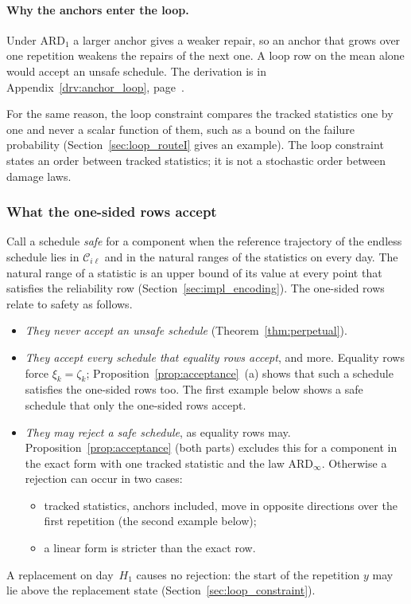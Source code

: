 \documentclass[11pt,a4paper]{article}
\theoremstyle{plain}
\theoremstyle{definition}
\theoremstyle{remark}
\begin{document}
\paragraph{Why the anchors enter the loop.}
Under $\text{ARD}_1$ a larger anchor gives a weaker repair, so an anchor that grows over one repetition weakens the repairs of the next one.
A loop row on the mean alone would accept an unsafe schedule.
The derivation is in Appendix~\ref{drv:anchor_loop}, page~\pageref{drv:anchor_loop}.

For the same reason, the loop constraint compares the tracked statistics one by one and never a scalar function of them, such as a bound on the failure probability (Section~\ref{sec:loop_routeI} gives an example).
The loop constraint states an order between tracked statistics; it is not a stochastic order between damage laws.

\subsubsection{What the one-sided rows accept}
\label{sec:acceptance}

Call a schedule \emph{safe} for a component when the reference trajectory of the endless schedule lies in $\mathcal{C}_{i\ell}$ and in the natural ranges of the statistics on every day.
The natural range of a statistic is an upper bound of its value at every point that satisfies the reliability row (Section~\ref{sec:impl_encoding}).
The one-sided rows relate to safety as follows.
\begin{itemize}
  \item \emph{They never accept an unsafe schedule} (Theorem~\ref{thm:perpetual}).
  \item \emph{They accept every schedule that equality rows accept}, and more.
    Equality rows force $\xi_k = \zeta_k$; Proposition~\ref{prop:acceptance}~(a) shows that such a schedule satisfies the one-sided rows too.
    The first example below shows a safe schedule that only the one-sided rows accept.
  \item \emph{They may reject a safe schedule}, as equality rows may.
    Proposition~\ref{prop:acceptance} (both parts) excludes this for a component in the exact form with one tracked statistic and the law $\text{ARD}_\infty$.
    Otherwise a rejection can occur in two cases:
    \begin{itemize}
      \item tracked statistics, anchors included, move in opposite directions over the first repetition (the second example below);
      \item a linear form is stricter than the exact row.
    \end{itemize}
\end{itemize}
A replacement on day~$H_1$ causes no rejection: the start of the repetition $y$ may lie above the replacement state (Section~\ref{sec:loop_constraint}).
\end{document}

